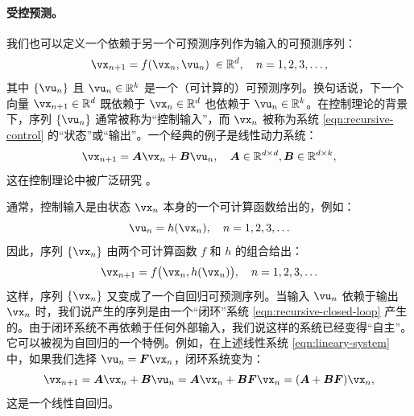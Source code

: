 \documentclass[../../book-main.tex]{subfiles}
\begin{document}
\paragraph{受控预测。}
我们也可以定义一个依赖于另一个可预测序列作为输入的可预测序列：
\begin{equation}
    \vx_{n+1} = f(\vx_{n}, \vu_n) \; \in \mathbb{R}^d, \quad n =  1, 2, 3, \ldots,
\label{eqn:recursive-control}
\end{equation}
其中 $\{\vu_n\}$ 且 $\vu_n \in \mathbb{R}^k$ 是一个（可计算的）可预测序列。换句话说，下一个向量 $\vx_{n+1} \in \mathbb{R}^d$ 既依赖于 $\vx_n \in \mathbb{R}^d$ 也依赖于 $\vu_n \in \mathbb{R}^k$。在控制理论的背景下，序列 $\{\vu_n\}$ 通常被称为“控制输入”，而 $\vx_n$ 被称为系统 \eqref{eqn:recursive-control} 的“状态”或“输出”。一个经典的例子是线性动力系统：
\begin{equation}
    \vx_{n+1} = \boldsymbol{A}\vx_n + \boldsymbol{B}\vu_n, \quad \boldsymbol{A} \in \mathbb{R}^{d\times d}, \boldsymbol{B} \in \mathbb{R}^{d\times k},
    \label{eqn:lineary-system} 
\end{equation}
这在控制理论中被广泛研究 \cite{Cal:Des}。

通常，控制输入是由状态 $\vx_n$ 本身的一个可计算函数给出的，例如：
\begin{equation}
    \vu_n = h(\vx_n), \quad n =  1, 2, 3, \ldots 
\end{equation}
因此，序列 $\{\vx_n\}$ 由两个可计算函数 $f$ 和 $h$ 的组合给出：
\begin{equation}
    \vx_{n+1} = f\big(\vx_{n}, h(\vx_n)\big), \quad n =  1, 2, 3, \ldots
    \label{eqn:recursive-closed-loop}
\end{equation}
这样，序列 $\{\vx_n\}$ 又变成了一个自回归可预测序列。当输入 $\vu_n$ 依赖于输出 $\vx_n$ 时，我们说产生的序列是由一个“闭环”系统 \eqref{eqn:recursive-closed-loop} 产生的。由于闭环系统不再依赖于任何外部输入，我们说这样的系统已经变得“自主”。它可以被视为自回归的一个特例。例如，在上述线性系统 \eqref{eqn:lineary-system} 中，如果我们选择 $\vu_n = \boldsymbol{F}\vx_n$，闭环系统变为：
\begin{equation}
        \vx_{n+1} = \boldsymbol{A}\vx_n + \boldsymbol{B}\vu_n = \boldsymbol{A}\vx_n + \boldsymbol{B}\boldsymbol{F}\vx_n = (\boldsymbol{A}+ \boldsymbol{B}\boldsymbol{F})\vx_n,
    \label{eqn:lineary-system-closed}
\end{equation}
这是一个线性自回归。

\end{document}
